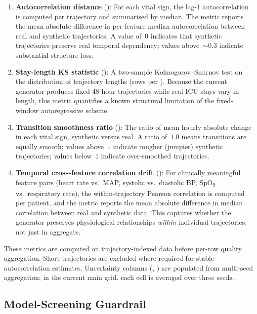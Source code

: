 \begin{enumerate}\tightlist
    \item \textbf{Autocorrelation distance} (): For each vital sign, the lag-1 autocorrelation is computed per trajectory and summarised by median. The metric reports the mean absolute difference in per-feature median autocorrelation between real and synthetic trajectories. A value of~$0$ indicates that synthetic trajectories preserve real temporal dependency; values above~$\sim 0.3$ indicate substantial structure loss.

    \item \textbf{Stay-length KS statistic} (): A two-sample Kolmogorov--Smirnov test on the distribution of trajectory lengths (rows per ). Because the current generator produces fixed 48-hour trajectories while real ICU stays vary in length, this metric quantifies a known structural limitation of the fixed-window autoregressive scheme.

    \item \textbf{Transition smoothness ratio} (): The ratio of mean hourly absolute change in each vital sign, synthetic versus real. A ratio of~$1.0$ means transitions are equally smooth; values above~$1$ indicate rougher (jumpier) synthetic trajectories; values below~$1$ indicate over-smoothed trajectories.

    \item \textbf{Temporal cross-feature correlation drift} (): For clinically meaningful feature pairs (heart rate vs.\ MAP, systolic vs.\ diastolic BP, SpO\textsubscript{2} vs.\ respiratory rate), the within-trajectory Pearson correlation is computed per patient, and the metric reports the mean absolute difference in median correlation between real and synthetic data. This captures whether the generator preserves physiological relationships \emph{within} individual trajectories, not just in aggregate.
\end{enumerate}

These metrics are computed on trajectory-indexed data before per-row quality aggregation. Short trajectories are excluded where required for stable autocorrelation estimates. Uncertainty columns (, ) are populated from multi-seed aggregation; in the current main grid, each cell is averaged over three seeds.

\subsection{Model-Screening Guardrail}

